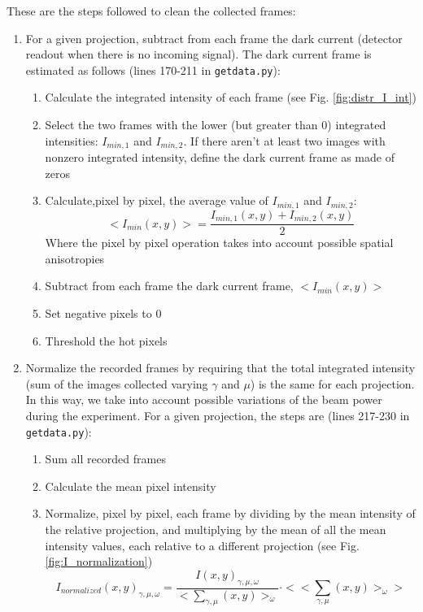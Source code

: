 \documentclass[11pt]{scrartcl}
\begin{document}
These are the steps followed to clean the collected frames:
\begin{enumerate}
    \item For a given projection, subtract from each frame the dark current (detector readout when there is no incoming signal). The dark current frame is estimated as follows (lines 170-211 in {\texttt{getdata.py}}):
    \begin{enumerate}
        \item Calculate the integrated intensity of each frame (see Fig. \ref{fig:distr_I_int})

        \item Select the two frames with the lower (but greater than 0) integrated intensities: $I_{min,1}$ and $I_{min,2}$. If there aren't at least two images with nonzero integrated intensity, define the dark current frame as made of zeros

        \item Calculate,pixel by pixel, the average value of $I_{min,1}$ and $I_{min,2}$:
        \begin{equation}
            <I_{min}(x,y)> = \frac{I_{min,1}(x,y) + I_{min,2}(x,y)}{2}
        \end{equation}
        Where the pixel by pixel operation takes into account possible spatial anisotropies

        \item Subtract from each frame the dark current frame, $<I_{min}(x,y)>$

        \item Set negative pixels to 0

        \item Threshold the hot pixels
    \end{enumerate}

    \item Normalize the recorded frames by requiring that the total integrated intensity (sum of the images collected varying $\gamma$ and $\mu$) is the same for each projection. In this way, we take into account possible
    variations of the beam power during the experiment. For a given projection, the steps are (lines 217-230 in {\texttt{getdata.py}}):
    \begin{enumerate}
        \item Sum all recorded frames

        \item Calculate the mean pixel intensity

        \item Normalize, pixel by pixel, each frame by dividing by the mean intensity of the relative projection, and multiplying by the mean of all the mean intensity values, each relative to a different projection (see Fig. \ref{fig:I_normalization})
            \begin{equation}
                I_{normalized}(x,y)_{\gamma, \mu, \omega} = \frac{I(x,y)_{\gamma, \mu, \omega}}{<\sum_{\gamma, \mu} (x,y)>_{\omega}}\cdot <<\sum_{\gamma, \mu} (x,y)>_{\omega}>
            \end{equation}
    \end{enumerate}


\end{enumerate}
\end{document}
